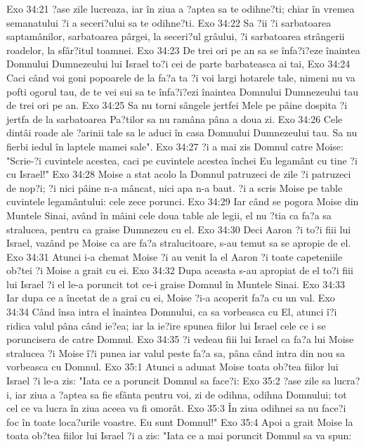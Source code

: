 Exo 34:21  ?ase zile lucreaza, iar în ziua a ?aptea sa te odihne?ti; chiar în vremea semanatului ?i a seceri?ului sa te odihne?ti.
Exo 34:22  Sa ?ii ?i sarbatoarea saptamânilor, sarbatoarea pârgei, la seceri?ul grâului, ?i sarbatoarea strângerii roadelor, la sfâr?itul toamnei.
Exo 34:23  De trei ori pe an sa se înfa?i?eze înaintea Domnului Dumnezeului lui Israel to?i cei de parte barbateasca ai tai,
Exo 34:24  Caci când voi goni popoarele de la fa?a ta ?i voi largi hotarele tale, nimeni nu va pofti ogorul tau, de te vei sui sa te înfa?i?ezi înaintea Domnului Dumnezeului tau de trei ori pe an.
Exo 34:25  Sa nu torni sângele jertfei Mele pe pâine dospita ?i jertfa de la sarbatoarea Pa?tilor sa nu ramâna pâna a doua zi.
Exo 34:26  Cele dintâi roade ale ?arinii tale sa le aduci în casa Domnului Dumnezeului tau. Sa nu fierbi iedul în laptele mamei sale".
Exo 34:27  ?i a mai zis Domnul catre Moise: "Scrie-?i cuvintele acestea, caci pe cuvintele acestea închei Eu legamânt cu tine ?i cu Israel!"
Exo 34:28  Moise a stat acolo la Domnul patruzeci de zile ?i patruzeci de nop?i; ?i nici pâine n-a mâncat, nici apa n-a baut. ?i a scris Moise pe table cuvintele legamântului: cele zece porunci.
Exo 34:29  Iar când se pogora Moise din Muntele Sinai, având în mâini cele doua table ale legii, el nu ?tia ca fa?a sa stralucea, pentru ca graise Dumnezeu cu el.
Exo 34:30  Deci Aaron ?i to?i fiii lui Israel, vazând pe Moise ca are fa?a stralucitoare, s-au temut sa se apropie de el.
Exo 34:31  Atunci i-a chemat Moise ?i au venit la el Aaron ?i toate capeteniile ob?tei ?i Moise a grait cu ei.
Exo 34:32  Dupa aceasta s-au apropiat de el to?i fiii lui Israel ?i el le-a poruncit tot ce-i graise Domnul în Muntele Sinai.
Exo 34:33  Iar dupa ce a încetat de a grai cu ei, Moise ?i-a acoperit fa?a cu un val.
Exo 34:34  Când însa intra el înaintea Domnului, ca sa vorbeasca cu El, atunci î?i ridica valul pâna când ie?ea; iar la ie?ire spunea fiilor lui Israel cele ce i se poruncisera de catre Domnul.
Exo 34:35  ?i vedeau fiii lui Israel ca fa?a lui Moise stralucea ?i Moise î?i punea iar valul peste fa?a sa, pâna când intra din nou sa vorbeasca cu Domnul.
Exo 35:1  Atunci a adunat Moise toata ob?tea fiilor lui Israel ?i le-a zis: "Iata ce a poruncit Domnul sa face?i:
Exo 35:2  ?ase zile sa lucra?i, iar ziua a ?aptea sa fie sfânta pentru voi, zi de odihna, odihna Domnului; tot cel ce va lucra în ziua aceea va fi omorât.
Exo 35:3  În ziua odihnei sa nu face?i foc în toate loca?urile voastre. Eu sunt Domnul!"
Exo 35:4  Apoi a grait Moise la toata ob?tea fiilor lui Israel ?i a zis: "Iata ce a mai poruncit Domnul sa va spun:
